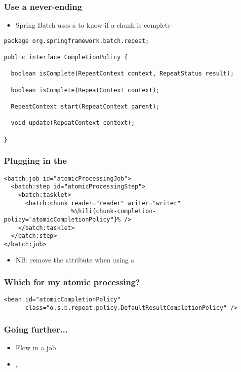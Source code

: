 \begin{frame}[fragile]
 \frametitle{Use a never-ending }
 \begin{itemize}
  \item Spring Batch uses a  to know if a chunk is complete
 \end{itemize}
 \lstset{language=Java}
\begin{lstlisting}
package org.springframework.batch.repeat;

public interface CompletionPolicy {

  boolean isComplete(RepeatContext context, RepeatStatus result);

  boolean isComplete(RepeatContext context);

  RepeatContext start(RepeatContext parent);

  void update(RepeatContext context);

}
\end{lstlisting}
\end{frame}

\begin{frame}[fragile]
 \frametitle{Plugging in the }
 \lstset{language=XML}
\begin{lstlisting}
<batch:job id="atomicProcessingJob">
  <batch:step id="atomicProcessingStep">
    <batch:tasklet>
      <batch:chunk reader="reader" writer="writer" 
                   %\hili{chunk-completion-policy="atomicCompletionPolicy"}% />
    </batch:tasklet>
  </batch:step>
</batch:job>
\end{lstlisting}
\begin{itemize}
  \item NB: remove the  attribute when using a 
 \end{itemize}
\end{frame}

\begin{frame}[fragile]
 \frametitle{Which  for my atomic processing?}
 \lstset{language=XML}
\begin{lstlisting}
<bean id="atomicCompletionPolicy"
      class="o.s.b.repeat.policy.DefaultResultCompletionPolicy" />
\end{lstlisting}
\end{frame}

\begin{frame}
 \frametitle{Going further...}
 \begin{itemize}  
  \item Flow in a job
  \item {}, 
 \end{itemize}
\end{frame}